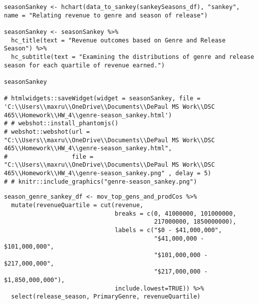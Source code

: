 \begin{lstlisting}
seasonSankey <- hchart(data_to_sankey(sankeySeasons_df), "sankey", name = "Relating revenue to genre and season of release")

seasonSankey <- seasonSankey %>%
  hc_title(text = "Revenue outcomes based on Genre and Release Season") %>%
  hc_subtitle(text = "Examining the distributions of genre and release season for each quartile of revenue earned.")

seasonSankey

# htmlwidgets::saveWidget(widget = seasonSankey, file = 'C:\\Users\\maxru\\OneDrive\\Documents\\DePaul MS Work\\DSC 465\\Homework\\HW_4\\genre-season_sankey.html')
# # webshot::install_phantomjs()
# webshot::webshot(url = "C:\\Users\\maxru\\OneDrive\\Documents\\DePaul MS Work\\DSC 465\\Homework\\HW_4\\genre-season_sankey.html",
#                  file = "C:\\Users\\maxru\\OneDrive\\Documents\\DePaul MS Work\\DSC 465\\Homework\\HW_4\\genre-season_sankey.png" , delay = 5)
# # knitr::include_graphics("genre-season_sankey.png")
\end{lstlisting}

\begin{lstlisting}
season_genre_sankey_df <- mov_top_gens_and_prodCos %>%
  mutate(revenueQuartile = cut(revenue,
                               breaks = c(0, 41000000, 101000000, 
                                          217000000, 1850000000),
                               labels = c("$0 - $41,000,000",
                                          "$41,000,000 - $101,000,000",
                                          "$101,000,000 - $217,000,000",
                                          "$217,000,000 - $1,850,000,000"),
                               include.lowest=TRUE)) %>%
  select(release_season, PrimaryGenre, revenueQuartile)
\end{lstlisting}

